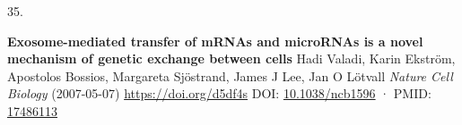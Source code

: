 \documentclass[
]{article}
\newlength{\cslhangindent}
\newlength{\csllabelwidth}
\newlength{\cslentryspacingunit} %
\newenvironment{CSLReferences}[2] %
 {%
  \setlength{\parindent}{0pt}
  \ifodd #1
  \let\oldpar\par
  \def\par{\hangindent=\cslhangindent\oldpar}
  \fi
  \setlength{\parskip}{#2\cslentryspacingunit}
 }%
 {}
\newcommand{\CSLBlock}[1]{#1\hfill\break}
\newcommand{\CSLLeftMargin}[1]{\parbox[t]{\csllabelwidth}{#1}}
\newcommand{\CSLRightInline}[1]{\parbox[t]{\linewidth - \csllabelwidth}{#1}\break}
\begin{document}
\begin{CSLReferences}{0}{0}
\leavevmode{}%
\CSLLeftMargin{35. }%
\CSLRightInline{\textbf{Exosome-mediated transfer of mRNAs and microRNAs is a novel mechanism of genetic exchange between cells}
\CSLBlock{Hadi Valadi, Karin Ekström, Apostolos Bossios, Margareta Sjöstrand, James J Lee, Jan O Lötvall} \emph{Nature Cell Biology} (2007-05-07) \url{https://doi.org/d5df4s}
\CSLBlock{DOI: \href{https://doi.org/10.1038/ncb1596}{10.1038/ncb1596} · PMID: \href{https://www.ncbi.nlm.nih.gov/pubmed/17486113}{17486113}}}

\end{CSLReferences}
\end{document}
